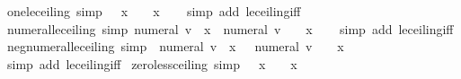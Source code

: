 \begin{isabellebody}
\endisatagproof
{\isafoldproof}%
%
\isadelimproof
\isanewline
%
\endisadelimproof
\isanewline
{}\isamarkupfalse%
\ one{\isacharunderscore}{\kern0pt}le{\isacharunderscore}{\kern0pt}ceiling\ {\isacharbrackleft}{\kern0pt}simp{\isacharbrackright}{\kern0pt}{\isacharcolon}{\kern0pt}\ {\isachardoublequoteopen}{}\ {\isasymle}\ {\isasymlceil}x{\isasymrceil}\ {\isasymlongleftrightarrow}\ {}\ {\isacharless}{\kern0pt}\ x{\isachardoublequoteclose}\isanewline
%
\isadelimproof
\ \ %
\endisadelimproof
%
\isatagproof
{}\isamarkupfalse%
\ {\isacharparenleft}{\kern0pt}simp\ add{\isacharcolon}{\kern0pt}\ le{\isacharunderscore}{\kern0pt}ceiling{\isacharunderscore}{\kern0pt}iff{\isacharparenright}{\kern0pt}%
\endisatagproof
{\isafoldproof}%
%
\isadelimproof
\isanewline
%
\endisadelimproof
\isanewline
{}\isamarkupfalse%
\ numeral{\isacharunderscore}{\kern0pt}le{\isacharunderscore}{\kern0pt}ceiling\ {\isacharbrackleft}{\kern0pt}simp{\isacharbrackright}{\kern0pt}{\isacharcolon}{\kern0pt}\ {\isachardoublequoteopen}numeral\ v\ {\isasymle}\ {\isasymlceil}x{\isasymrceil}\ {\isasymlongleftrightarrow}\ numeral\ v\ {\isacharminus}{\kern0pt}\ {}\ {\isacharless}{\kern0pt}\ x{\isachardoublequoteclose}\isanewline
%
\isadelimproof
\ \ %
\endisadelimproof
%
\isatagproof
{}\isamarkupfalse%
\ {\isacharparenleft}{\kern0pt}simp\ add{\isacharcolon}{\kern0pt}\ le{\isacharunderscore}{\kern0pt}ceiling{\isacharunderscore}{\kern0pt}iff{\isacharparenright}{\kern0pt}%
\endisatagproof
{\isafoldproof}%
%
\isadelimproof
\isanewline
%
\endisadelimproof
\isanewline
{}\isamarkupfalse%
\ neg{\isacharunderscore}{\kern0pt}numeral{\isacharunderscore}{\kern0pt}le{\isacharunderscore}{\kern0pt}ceiling\ {\isacharbrackleft}{\kern0pt}simp{\isacharbrackright}{\kern0pt}{\isacharcolon}{\kern0pt}\ {\isachardoublequoteopen}{\isacharminus}{\kern0pt}\ numeral\ v\ {\isasymle}\ {\isasymlceil}x{\isasymrceil}\ {\isasymlongleftrightarrow}\ {\isacharminus}{\kern0pt}\ numeral\ v\ {\isacharminus}{\kern0pt}\ {}\ {\isacharless}{\kern0pt}\ x{\isachardoublequoteclose}\isanewline
%
\isadelimproof
\ \ %
\endisadelimproof
%
\isatagproof
{}\isamarkupfalse%
\ {\isacharparenleft}{\kern0pt}simp\ add{\isacharcolon}{\kern0pt}\ le{\isacharunderscore}{\kern0pt}ceiling{\isacharunderscore}{\kern0pt}iff{\isacharparenright}{\kern0pt}%
\endisatagproof
{\isafoldproof}%
%
\isadelimproof
\isanewline
%
\endisadelimproof
\isanewline
{}\isamarkupfalse%
\ zero{\isacharunderscore}{\kern0pt}less{\isacharunderscore}{\kern0pt}ceiling\ {\isacharbrackleft}{\kern0pt}simp{\isacharbrackright}{\kern0pt}{\isacharcolon}{\kern0pt}\ {\isachardoublequoteopen}{}\ {\isacharless}{\kern0pt}\ {\isasymlceil}x{\isasymrceil}\ {\isasymlongleftrightarrow}\ {}\ {\isacharless}{\kern0pt}\ x{\isachardoublequoteclose}\isanewline

\end{isabellebody}
